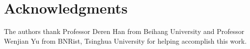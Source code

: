 \section*{Acknowledgments}



The authors thank Professor Deren Han from Beihang University and Professor Wenjian Yu from BNRist, Tsinghua University for helping accomplish this work.
